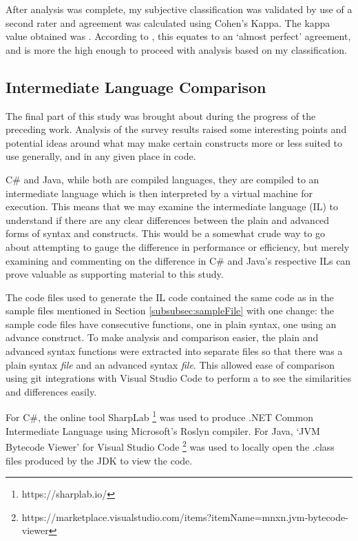 \documentclass{article}
\begin{document}
        After analysis was complete, my subjective classification was validated by use of a second rater and agreement was calculated using Cohen's Kappa. The kappa value obtained was . According to \cite{cohensKappa}, this equates to an `almost perfect' agreement, and is more the high enough to proceed with analysis based on my classification.

    \subsection{Intermediate Language Comparison}
        The final part of this study was brought about during the progress of the preceding work. Analysis of the survey results raised some interesting points and potential ideas around what may make certain constructs more or less suited to use generally, and in any given place in code.

        C\# and Java, while both are compiled languages, they are compiled to an intermediate language which is then interpreted by a virtual machine for execution. This means that we may examine the intermediate language (IL) to understand if there are any clear differences between the plain and advanced forms of syntax and constructs. This would be a somewhat crude way to go about attempting to gauge the difference in performance or efficiency, but merely examining and commenting on the difference in C\# and Java's respective ILs can prove valuable as supporting material to this study.
        
        The code files used to generate the IL code contained the same code as in the sample files mentioned in Section \ref{subsubsec:sampleFile} with one change: the sample code files have consecutive functions, one in plain syntax, one using an advance construct. To make analysis and comparison easier, the plain and advanced syntax functions were extracted into separate files so that there was a plain syntax \emph{file} and an advanced syntax \emph{file}. This allowed ease of comparison using git integrations with Visual Studio Code to perform a  to see the similarities and differences easily. 

        For C\#, the online tool SharpLab \footnote{https://sharplab.io/} was used to produce .NET Common Intermediate Language using Microsoft's Roslyn  compiler. For Java, `JVM Bytecode Viewer' for Visual Studio Code \footnote{https://marketplace.visualstudio.com/items?itemName=mnxn.jvm-bytecode-viewer} was used to locally open the .class files produced by the JDK to view the code.
\end{document}
